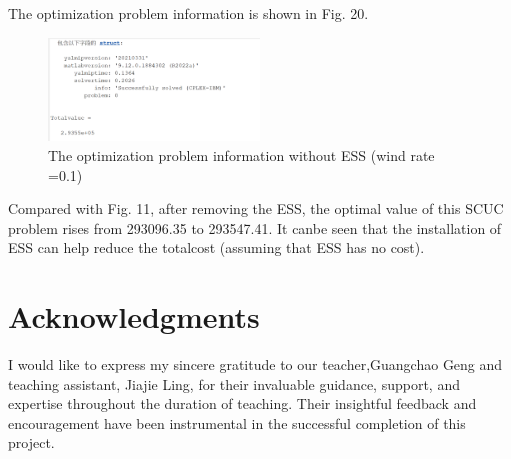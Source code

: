 \documentclass[lettersize,journal]{IEEEtran}
\begin{document}
The optimization problem information is shown in Fig. 20.
\begin{figure}[htbp]
	\centering
	\includegraphics[width=0.5\textwidth]{t3-opt-noESS}
	\caption{The optimization problem information without ESS (wind rate =0.1)}
	\label{fig_2}
\end{figure}

Compared with Fig. 11, after removing the ESS, the optimal value of this SCUC problem rises from 293096.35 to 293547.41. It canbe seen that the installation of ESS can help reduce the totalcost (assuming that ESS has no cost).

\section{Acknowledgments}
I would like to express my sincere gratitude to our teacher,Guangchao Geng and teaching assistant, Jiajie Ling, for their invaluable guidance, support, and expertise throughout the duration of teaching. Their insightful feedback and encouragement have been instrumental in the successful completion of this project.
\end{document}
